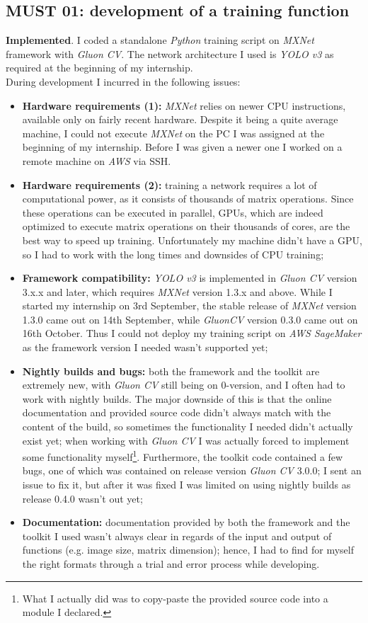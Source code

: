 \subsection{MUST 01: development of a training function}
\textbf{Implemented}. I coded a standalone \emph{Python} training script on \emph{MXNet} framework with \emph{Gluon CV}. The network architecture I used is \emph{YOLO v3} as required at the beginning of my internship. \\
During development I incurred in the following issues:
\begin{itemize}
	\item \textbf{Hardware requirements (1):} \emph{MXNet} relies on newer CPU instructions, available only on fairly recent hardware. Despite it being a quite average machine, I could not execute \emph{MXNet} on the PC I was assigned at the beginning of my internship. Before I was given a newer one I worked on a remote machine on \emph{AWS} via SSH.
	\item \textbf{Hardware requirements (2):} training a network requires a lot of computational power, as it consists of thousands of matrix operations. Since these operations can be executed in parallel, GPUs, which are indeed optimized to execute matrix operations on their thousands of cores, are the best way to speed up training. Unfortunately my machine didn't have a GPU, so I had to work with the long times and downsides of CPU training;
	\item \textbf{Framework compatibility:} \emph{YOLO v3} is implemented in \emph{Gluon CV} version 3.x.x and later, which requires \emph{MXNet} version 1.3.x and above. While I started my internship on 3rd September, the stable release of \emph{MXNet} version 1.3.0 came out on 14th September, while \emph{GluonCV} version 0.3.0 came out on 16th October. Thus I could not deploy my training script on \emph{AWS SageMaker} as the framework version I needed wasn't supported yet;
	\item \textbf{Nightly builds and bugs:} both the framework and the toolkit are extremely new, with \emph{Gluon CV} still being on 0-version, and I often had to work with nightly builds. The major downside of this is that the online documentation and provided source code didn't always match with the content of the build, so sometimes the functionality I needed didn't actually exist yet; when working with \emph{Gluon CV} I was actually forced to implement some functionality myself\footnote{What I actually did was to copy-paste the provided source code into a module I declared.}. Furthermore, the toolkit code contained a few bugs, one of which was contained on release version \emph{Gluon CV} 3.0.0; I sent an issue to fix it, but after it was fixed I was limited on using nightly builds as release 0.4.0 wasn't out yet; 
	\item \textbf{Documentation:} documentation provided by both the framework and the toolkit I used wasn't always clear in regards of the input and output of functions (e.g. image size, matrix dimension); hence, I had to find for myself the right formats through a trial and error process while developing.
\end{itemize}

